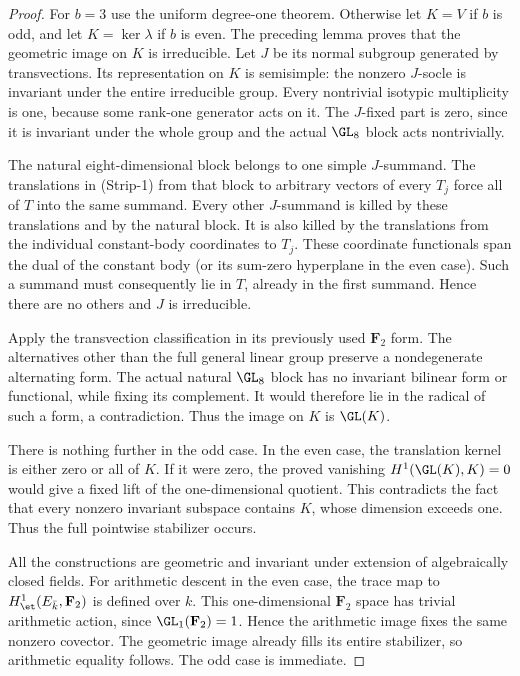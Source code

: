 \begin{proof}
For $b=3$ use the uniform degree-one theorem. Otherwise let $K=V$
if $b$ is odd, and let $K=\ker\lambda$ if $b$ is even. The
preceding lemma proves that the geometric image on $K$ is
irreducible. Let $J$ be its normal subgroup generated by
transvections. Its representation on $K$ is semisimple: the
nonzero $J$-socle is invariant under the entire irreducible group.
Every nontrivial isotypic multiplicity is one, because some
rank-one generator acts on it. The $J$-fixed part is zero,
since it is invariant under the whole group and the actual
$\GL_8$ block acts nontrivially.

The natural eight-dimensional block belongs to one simple
$J$-summand. The translations in (Strip-1) from that block to
arbitrary vectors of every $T_j$ force all of $T$ into the
same summand. Every other $J$-summand is killed by these
translations and by the natural block. It is also killed by
the translations from the individual constant-body coordinates
to $T_j$. These coordinate functionals span the dual of the
constant body (or its sum-zero hyperplane in the even case).
Such a summand must consequently lie in $T$, already in the
first summand. Hence there are no others and $J$ is irreducible.

Apply the transvection classification
\cite[Theorem~3.6, printed p.~22]{KantorSeress2001} in its
previously used $\mathbf F_2$ form. The alternatives other
than the full general linear group preserve a nondegenerate
alternating form. The actual natural $\GL_8$ block has no
invariant bilinear form or functional, while fixing its
complement. It would therefore lie in the radical of such
a form, a contradiction. Thus the image on $K$ is $\GL(K)$.

There is nothing further in the odd case. In the even case,
the translation kernel is either zero or all of $K$.
If it were zero, the proved vanishing $H^1(\GL(K),K)=0$
would give a fixed lift of the one-dimensional quotient.
This contradicts the fact that every nonzero invariant
subspace contains $K$, whose dimension exceeds one.
Thus the full pointwise stabilizer occurs.

All the constructions are geometric and invariant under
extension of algebraically closed fields. For arithmetic
descent in the even case, the trace map to
$H^1_{\et}(E_{\bar k},\mathbf F_2)$ is defined over $k$.
This one-dimensional $\mathbf F_2$ space has trivial
arithmetic action, since $\GL_1(\mathbf F_2)=1$.
Hence the arithmetic image fixes the same nonzero covector.
The geometric image already fills its entire stabilizer,
so arithmetic equality follows. The odd case is immediate.
\end{proof}

